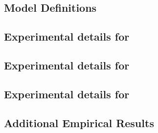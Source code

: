 \subsection{Model Definitions}
\label{app:exp:mlp-variants}


\subsection{Experimental details for~}
\label{app:exp:section3}


\subsection{Experimental details for~}
\label{app:exp:section4}


\subsection{Experimental details for~}
\label{app:exp:section5}


\subsection{Additional Empirical Results}
\label{app:exp:additional-results}

